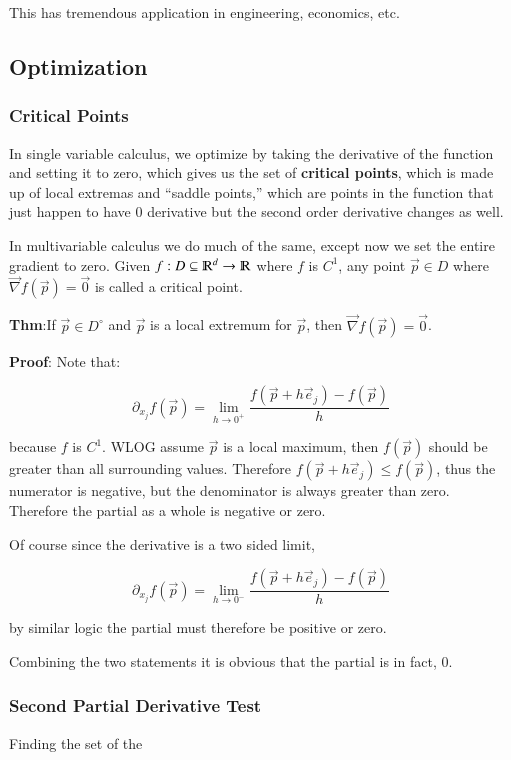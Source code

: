 \documentclass [12 pt, twoside] {book}
\newcommand\+{\text{ }}
\newcommand{\gradient}{\vec{\nabla}}
\begin{document}
This has tremendous application in engineering, economics, etc.
\subsection{Optimization}
\subsubsection{Critical Points}
In single variable calculus, we optimize by taking the derivative of the
function and setting it to zero, which gives us the set of \textbf{critical
points}, which is made up of local extremas and ``saddle points,'' which are
points in the function that just happen to have 0 derivative but the second
order derivative changes as well.

In multivariable calculus we do much of the same, except now we set the entire
gradient to zero. Given $f: D \subseteq \varmathbb{R}^d \to \varmathbb{R}$ where
$f$ is $C^1$, any point $\vec{p} \in D$ where $\gradient f(\vec{p}) = \vec{0}$
is called a critical point.

\textbf{Thm}:If $\vec{p} \in D^\circ$ and $\vec{p}$ is a local extremum for
$\vec{p}$, then $\gradient f(\vec{p}) = \vec{0}$.

\textbf{Proof}: Note that:

$$\partial_{x_j} f(\vec{p}) = \lim_{h \to 0^+} \frac{f(\vec{p} +
h\vec{e}_j) - f(\vec{p})}{h}$$

because $f$ is $C^1$. WLOG assume $\vec{p}$ is a local maximum, then
$f(\vec{p})$ should be greater than all surrounding values. Therefore $f(\vec{p}
+ h\vec{e}_j) \leq f(\vec{p})$, thus the numerator is negative, but the denominator
is always greater than zero. Therefore the partial as a whole is negative or
zero.

Of course since the derivative is a two sided limit, 

$$\partial_{x_j} f(\vec{p}) = \lim_{h \to 0^-} \frac{f(\vec{p} +
h\vec{e}_j) - f(\vec{p})}{h}$$

by similar logic the partial must therefore be positive or zero.

Combining the two statements it is obvious that the partial is in fact, 0.

\subsubsection{Second Partial Derivative Test}

Finding the set of the 
\end{document}
